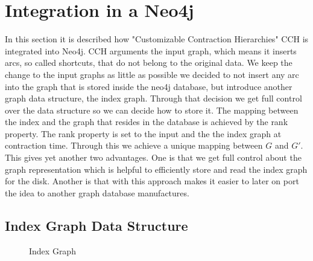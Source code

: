 \chapter{Integration in a Neo4j}

In this section it is described how "Customizable Contraction Hierarchies" CCH is integrated into Neo4j. CCH arguments the input graph, which means it inserts arcs, so called shortcuts, that do not belong to the original data. We keep the change to the input graphs as little as possible we decided to not insert any arc into the graph that is stored inside the neo4j database, but introduce another graph data structure, the index graph. Through that 
decision we get full control over the data structure so we can decide how to store it.   
The mapping between the index and the graph that resides in the database is achieved by the rank property. The rank property is set to the input and the the index graph at contraction time. Through this we achieve a unique mapping between $G$ and $G'$.
This gives yet another two advantages. One is that we get full control about the graph representation which is helpful to efficiently store and read the index graph for the disk. Another is that with this approach makes it easier to later on port the idea to another graph database manufactures.

\section{Index Graph Data Structure}\label{sec:index_graph}

\begin{figure}
     
    
    \caption{Index Graph}
    \label{uml:index_graph}
\end{figure}

